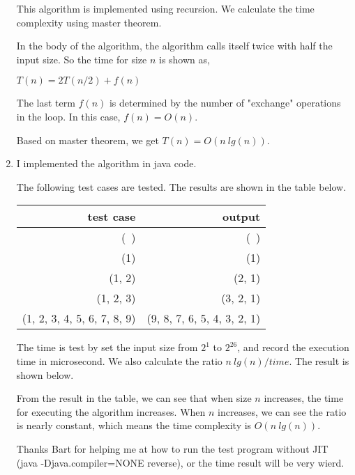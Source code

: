 \documentclass[11pt,letterpaper,oneside]{article}
\begin{document}
\begin{enumerate}
This algorithm is implemented using recursion. We calculate the time complexity using master theorem.

In the body of the algorithm, the algorithm calls itself twice with half the input size. So the time for size $n$ is shown as,

$T(n) = 2T(n/2) + f(n)$

The last term $f(n)$ is determined by the number of "exchange" operations in the loop. In this case, $f(n) = O(n)$.

Based on master theorem, we get $T(n) = O(n\ lg(n))$.

\item I implemented the algorithm in java code.

The following test cases are tested. The results are shown in the table below.

\begin{tabular}{rr}
test case & output \\ \hline
(\ ) & (\ ) \\
(1) & (1) \\
(1, 2) & (2, 1) \\
(1, 2, 3) & (3, 2, 1) \\
(1, 2, 3, 4, 5, 6, 7, 8, 9) & (9, 8, 7, 6, 5, 4, 3, 2, 1)
\end{tabular}

\null
\null

The time is test by set the input size from $2^1$ to $2^{26}$, and record the execution time in microsecond. We also calculate the ratio $n\ lg(n)/time$. The result is shown below.

From the result in the table, we can see that when size $n$ increases, the time for executing the algorithm increases. When $n$ increases, we can see the ratio is nearly constant, which means the time complexity is $O(n\ lg(n))$.

Thanks Bart for helping me at how to run the test program without JIT (java -Djava.compiler=NONE reverse), or the time result will be very wierd.


\end{enumerate}
\end{document}
